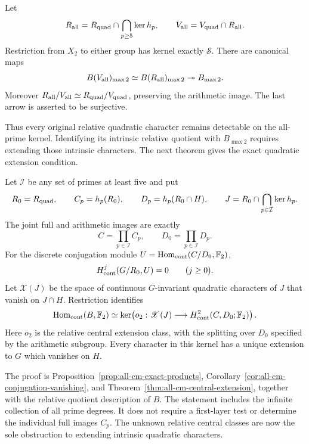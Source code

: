 \begin{theorem}\label{thm:main-all-cm-restriction}
Let
\[
 R_{\rm all}=R_{\rm quad}\cap\bigcap_{p\ge5}\ker h_p,\qquad
 V_{\rm all}=V_{\rm quad}\cap R_{\rm all}.
\]
Restriction from \(X_2\) to either group has kernel exactly
\(\mathcal S\). There are canonical maps
\[
 B(V_{\rm all})_{\max2}\simeq B(R_{\rm all})_{\max2}
                         \twoheadrightarrow B_{\max2}.
\]
Moreover \(R_{\rm all}/V_{\rm all}\simeq
R_{\rm quad}/V_{\rm quad}\), preserving the arithmetic image.
The last arrow is asserted to be surjective.
\end{theorem}

Thus every original relative quadratic character remains detectable
on the all-prime kernel. Identifying its intrinsic relative quotient
with \(B_{\max2}\) requires extending those intrinsic characters.
The next theorem gives the exact quadratic extension condition.

\begin{theorem}\label{thm:main-all-cm-central-obstruction}
Let \(\mathcal I\) be any set of primes at least five and put
\[
 R_0=R_{\rm quad},\qquad
 C_p=h_p(R_0),\qquad D_p=h_p(R_0\cap H),\qquad
 J=R_0\cap\bigcap_{p\in\mathcal I}\ker h_p.
\]
The joint full and arithmetic images are exactly
\[
 C=\prod_{p\in\mathcal I}C_p,\qquad
 D_0=\prod_{p\in\mathcal I}D_p.
\]
For the discrete conjugation module
\(U=\operatorname{Hom}_{\rm cont}(C/D_0,\mathbb F_2)\),
\[
 H^j_{\rm cont}(G/R_0,U)=0\qquad(j\ge0).
\]
Let \(\mathscr X(J)\) be the space of continuous \(G\)-invariant
quadratic characters of \(J\) that vanish on \(J\cap H\).
Restriction identifies
\[
 \operatorname{Hom}_{\rm cont}(B,\mathbb F_2)
 \simeq\ker\!\left(
 o_2:\mathscr X(J)\longrightarrow H^2_{\rm cont}(C,D_0;\mathbb F_2)
 \right).
\]
Here \(o_2\) is the relative central extension class, with the
splitting over \(D_0\) specified by the arithmetic subgroup.
Every character in this kernel has a unique extension to \(G\)
which vanishes on \(H\).
\end{theorem}

The proof is Proposition~\ref{prop:all-cm-exact-products},
Corollary~\ref{cor:all-cm-conjugation-vanishing}, and
Theorem~\ref{thm:all-cm-central-extension}, together with the
relative quotient description of \(B\).
The statement includes the infinite collection of all prime degrees.
It does not require a first-layer test or determine the individual
full images \(C_p\). The unknown relative central classes are now
the sole obstruction to extending intrinsic quadratic characters.

